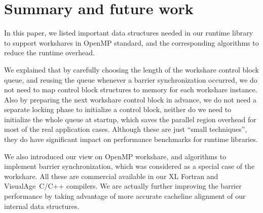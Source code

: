 
\section{Summary and future work}


In this paper, we listed important data structures needed in our
runtime library to support workshares in OpenMP standard, and the
corresponding algorithms to reduce the runtime overhead.

We explained that by carefully choosing the length of the workshare
control block queue, and reusing the queue whenever a barrier
synchronization occurred, we do not need to map control block
structures to memory for each workshare instance.  Also by preparing
the next workshare control block in advance, we do not need a separate
locking phase to initialize a control block, neither do we need to
initialize the whole queue at startup, which saves the parallel
region overhead for most of the real application cases. Although these
are just ``small techniques'', they do have significant impact on
performance benchmarks for runtime libraries.

We also introduced our view on OpenMP workshare, and algorithms to
implement barrier synchronization, which was considered as a special case of the
workshare. All these are commercial available in our XL Fortran and
VisualAge\textregistered\  C/C++ compilers. We are actually further improving the
barrier performance by taking advantage of more accurate cacheline
alignment of our internal data structures.


